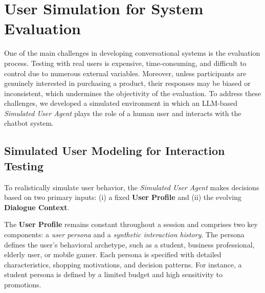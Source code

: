 \section{User Simulation for System Evaluation}\label{sec:user_simulation}

One of the main challenges in developing conversational systems is the evaluation process. Testing with real users is expensive, time-consuming, and difficult to control due to numerous external variables. Moreover, unless participants are genuinely interested in purchasing a product, their responses may be biased or inconsistent, which undermines the objectivity of the evaluation. To address these challenges, we developed a simulated environment in which an LLM-based \textit{Simulated User Agent} plays the role of a human user and interacts with the chatbot system.




\subsection{Simulated User Modeling for Interaction Testing}

To realistically simulate user behavior, the \textit{Simulated User Agent} makes decisions based on two primary inputs: (i) a fixed \textbf{User Profile} and (ii) the evolving \textbf{Dialogue Context}.


The \textbf{User Profile} remains constant throughout a session and comprises two key components: a \textit{user persona} and a \textit{synthetic interaction history}. The persona defines the user's behavioral archetype, such as a student, business professional, elderly user, or mobile gamer. Each persona is specified with detailed characteristics, shopping motivations, and decision patterns. For instance, a student persona is defined by a limited budget and high sensitivity to promotions.

